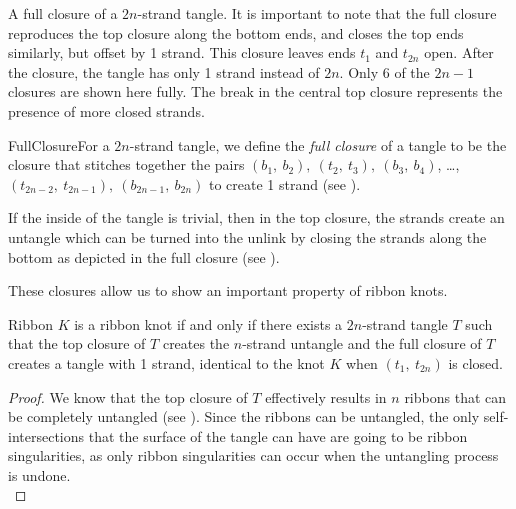 \begin{paper}
{A full closure of a $2n$-strand tangle.
It is important to note that the full closure reproduces the top closure along
the bottom ends, and closes the top ends similarly, but offset by 1 strand.
This closure leaves ends $t_1$ and $t_{2n}$ open.
After the closure, the tangle has only 1 strand instead of $2n$.
Only 6 of the $2n-1$ closures are shown here fully.
The break in the central top closure represents the presence of more closed
strands.}

\begin{paperdef}{FullClosure}{For a $2n$-strand tangle, we define the
\textit{full closure} of a tangle to be the closure that stitches together the
pairs $(b_1,~b_2),~(t_2,~t_3),~(b_3,~b_4)$, \dots,
$(t_{2n-2},~t_{2n-1}),~(b_{2n-1},~b_{2n})$ to create 1 strand (see
\figFull).}\end{paperdef}

If the inside of the tangle is trivial, then in the top closure, the strands
create an untangle which can be turned into the unlink by closing the strands
along the bottom as depicted in the full closure (see \figFull).

These closures allow us to show an important property of ribbon knots.

\begin{paperthm}{Ribbon}
$K$ is a ribbon knot if and only if there exists a $2n$-strand tangle $T$ such
that the top closure of $T$ creates the $n$-strand untangle and the full closure
of $T$ creates a tangle with 1 strand, identical to the knot $K$ when
$(t_1,~t_{2n})$ is closed.
\end{paperthm}
\begin{proof}
We know that the top closure of $T$ effectively results in $n$ ribbons that can
be completely untangled (see \figTop).
Since the ribbons can be untangled, the only self-intersections that the surface
of the tangle can have are going to be ribbon singularities, as only ribbon
singularities can occur when the untangling process is undone.\\


\end{proof}
\end{paper}
